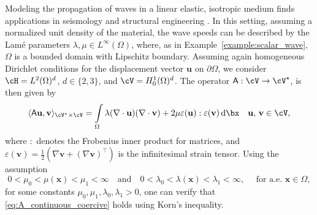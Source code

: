 \begin{example}\label{example:elastic_wave}
Modeling the propagation of waves in a linear elastic, isotropic medium finds applications in seismology \cite{fichtner2010full} and structural engineering \cite{Bigoni2020a}. In this setting, assuming a normalized unit density of the material, the wave speeds can be described by the Lamé parameters $\lambda, \mu \in L^\infty(\Omega)$, where, as in Example~\ref{example:scalar_wave}, $\Omega$ is a bounded domain with Lipschitz boundary.
Assuming again homogeneous Dirichlet conditions for the displacement vector $\mathbf{u}$ on $\partial\Omega$, we consider $\cH=L^2(\Omega)^d$, $d\in\{2,3\}$, and $\cV=H^1_0(\Omega)^d$. 
The operator $\mathsf{A}:\cV\to \cV^\star$, is then given by
\begin{align*}%
	\langle \mathsf{A} \mathbf{u},\mathbf{v}\rangle_{\cV^\star\times \cV} 
	= 
	\int\limits_{\Omega}
     \lambda (\nabla \cdot \mathbf{u})(\nabla \cdot \mathbf{v}) + 2\mu \varepsilon(\mathbf{u}):\varepsilon(\mathbf{v})\,\mathrm{d}\bx
	\quad
	\mathbf{u},\, \mathbf{v} \in \cV,
\end{align*}
where $:$ denotes the Frobenius inner product for matrices, and $\varepsilon(\mathbf{v})=\frac{1}{2}(\nabla \mathbf{v}+ (\nabla\mathbf{v})^\top)$ is the infinitesimal strain tensor.
Using the assumption
\begin{equation}
    0<\mu_0<\mu({\bm x})< \mu_1<\infty
    \quad
    \text{and}
    \quad
    0<\lambda_0<\lambda({\bm x})< \lambda_1<\infty,
    \quad
    \text{ for a.e. }
    {\bm x} \in \Omega,
\end{equation}
for some constants $\mu_0,\mu_1,\lambda_0,\lambda_1>0$, one can verify that \eqref{eq:A_continuous_coercive} holds using Korn's inequality.




\end{example}
